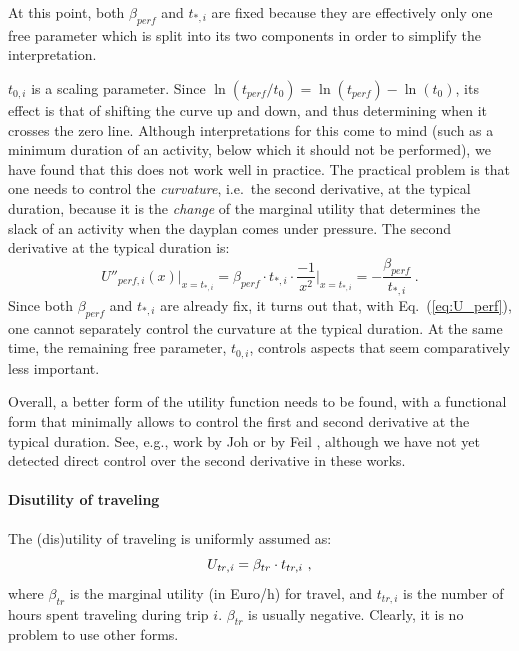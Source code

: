 At this point, both $\beta_{perf}$ and $t_{*,i}$ are fixed because
they are effectively only one free parameter which is split into its
two components in order to simplify the interpretation.

$t_{0,i}$ is a scaling parameter.  Since $\ln(t_{perf}/t_0) =
\ln(t_{perf}) - \ln(t_0)$, its effect is that of shifting the curve up
and down, and thus determining when it crosses the zero line.
Although interpretations for this come to mind (such as a minimum
duration of an activity, below which it should not be performed), we
have found that this does not work well in practice.  The practical
problem is that one needs to control the \emph{curvature}, i.e.\ the
second derivative, at the typical duration, because it is the
\emph{change} of the marginal utility that determines the slack of an
activity when the dayplan comes under pressure.  The second derivative
at the typical duration is:
\begin{equation}
U''_{perf,i}(x)|_{x=t_{*,i}} 
%
= \beta_{perf} \cdot t_{*,i} \cdot \frac{-1}{x^2} \Big|_{x=t_{*,i}}
%
= - \frac{\beta_{perf}}{t_{*,i}} \ .
\end{equation}
Since both $\beta_{perf}$ and $t_{*,i}$ are already fix, it turns out
that, with Eq.~(\ref{eq:U_perf}), one cannot separately control the
curvature at the typical duration. At the same time, the remaining free
parameter, $t_{0,i}$, controls aspects that seem comparatively less
important.

Overall, a better form of the utility function needs to be found, with
a functional form that minimally allows to control the first and
second derivative at the typical duration.  See, e.g., work by Joh
\citep{JohEtc2003utlFct} or by Feil \citep{FeilEtc2009NewUtlFct},
although we have not yet detected direct control over the second
derivative in these works.


\paragraph{Disutility of traveling}

The (dis)utility of traveling is uniformly assumed as:
\begin{equation}
\label{eq:U_travel}
U_{\it tr,i} = \beta_{tr} \cdot t_{tr,i}\ ,
\end{equation}
where $\beta_{tr}$ is the marginal utility (in Euro/h) for travel, and
$t_{tr,i}$ is the number of hours spent traveling during trip $i$.
$\beta_{tr}$ is usually negative.  Clearly, it is no problem to use
other forms.

